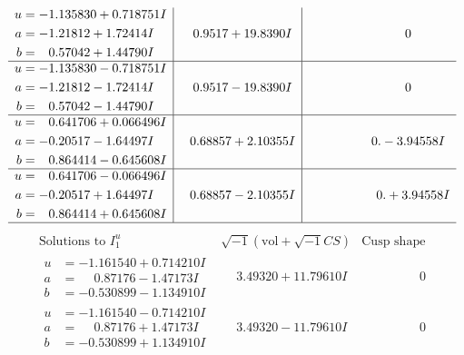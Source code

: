 \documentclass[1p]{elsarticle_modified}
\theoremstyle{definition}
\newcommand{\I}{\sqrt{-1}}
\begin{document}
$$\begin{array}{c|c|c}
\begin{aligned}
u &= -1.135830 + 0.718751 I \\
a &= -1.21812 + 1.72414 I \\
b &= \phantom{-}0.57042 + 1.44790 I\end{aligned}
 & \phantom{-}0.9517 + 19.8390 I & \phantom{-0.000000 } 0 \\ \hline\begin{aligned}
u &= -1.135830 - 0.718751 I \\
a &= -1.21812 - 1.72414 I \\
b &= \phantom{-}0.57042 - 1.44790 I\end{aligned}
 & \phantom{-}0.9517 - 19.8390 I & \phantom{-0.000000 } 0 \\ \hline\begin{aligned}
u &= \phantom{-}0.641706 + 0.066496 I \\
a &= -0.20517 - 1.64497 I \\
b &= \phantom{-}0.864414 - 0.645608 I\end{aligned}
 & \phantom{-}0.68857 + 2.10355 I & \phantom{-0.000000 } 0. - 3.94558 I \\ \hline\begin{aligned}
u &= \phantom{-}0.641706 - 0.066496 I \\
a &= -0.20517 + 1.64497 I \\
b &= \phantom{-}0.864414 + 0.645608 I\end{aligned}
 & \phantom{-}0.68857 - 2.10355 I & \phantom{-0.000000 -}0. + 3.94558 I\\
 \hline 
 \end{array}$$\newpage$$\begin{array}{c|c|c}  
\text{Solutions to }I^u_{1}& \I (\text{vol} + \sqrt{-1}CS) & \text{Cusp shape}\\
 \hline 
\begin{aligned}
u &= -1.161540 + 0.714210 I \\
a &= \phantom{-}0.87176 - 1.47173 I \\
b &= -0.530899 - 1.134910 I\end{aligned}
 & \phantom{-}3.49320 + 11.79610 I & \phantom{-0.000000 } 0 \\ \hline\begin{aligned}
u &= -1.161540 - 0.714210 I \\
a &= \phantom{-}0.87176 + 1.47173 I \\
b &= -0.530899 + 1.134910 I\end{aligned}
 & \phantom{-}3.49320 - 11.79610 I & \phantom{-0.000000 } 0 \\ \hline\begin{aligned}

\end{aligned}
\end{array}$$
\end{document}
